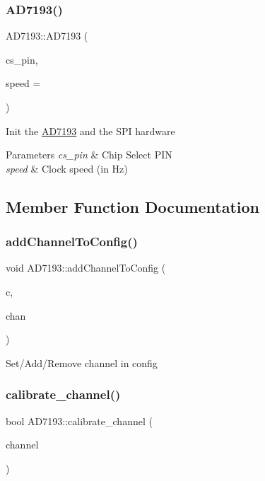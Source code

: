 \subsubsection{\texorpdfstring{A\+D7193()}{AD7193()}}
{\footnotesize\ttfamily A\+D7193\+::\+A\+D7193 (\begin{DoxyParamCaption}\item[{uint32\+\_\+t}]{cs\+\_\+pin,  }\item[{uint32\+\_\+t}]{speed = {} }\end{DoxyParamCaption})}

Init the \hyperlink{classAD7193}{A\+D7193} and the S\+PI hardware 
\begin{DoxyParams}{Parameters}
{\em cs\+\_\+pin} & Chip Select P\+IN \\
\hline
{\em speed} & Clock speed (in Hz) \\
\hline
\end{DoxyParams}


\subsection{Member Function Documentation}
\mbox{\label{classAD7193_acec57d6a685cf7268905efa52c8d40ed}} 
\subsubsection{\texorpdfstring{add\+Channel\+To\+Config()}{addChannelToConfig()}}
{\footnotesize\ttfamily void A\+D7193\+::add\+Channel\+To\+Config (\begin{DoxyParamCaption}\item[{\hyperlink{structAD7193_1_1config__t}{A\+D7193\+::config\+\_\+t} $\ast$}]{c,  }\item[{A\+D7193\+::channel\+\_\+t}]{chan }\end{DoxyParamCaption})\hspace{0.3cm}{\ttfamily [static]}}

Set/\+Add/\+Remove channel in config \mbox{\label{classAD7193_a8f58651520dbe473f2e67aeadb513d0c}} 
\subsubsection{\texorpdfstring{calibrate\+\_\+channel()}{calibrate\_channel()}}
{\footnotesize\ttfamily bool A\+D7193\+::calibrate\+\_\+channel (\begin{DoxyParamCaption}\item[{A\+D7193\+::channel\+\_\+t}]{channel }\end{DoxyParamCaption})}

